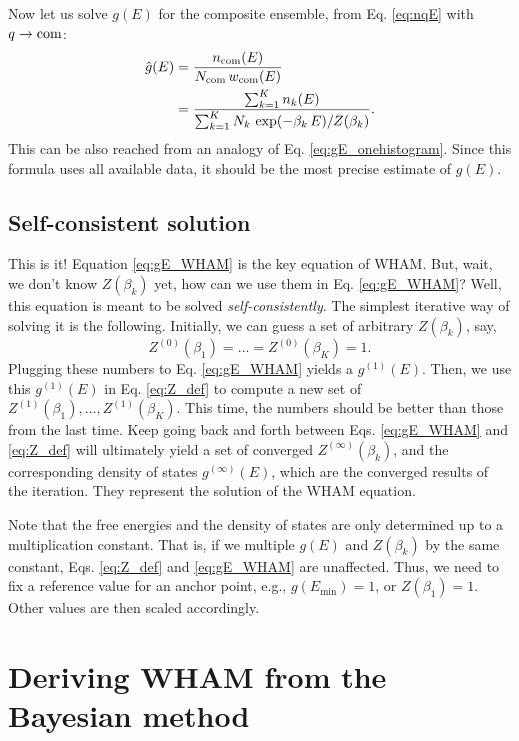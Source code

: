 \documentclass[aip,jcp,preprint,superscriptaddress]{revtex4-1}
\begin{document}
Now let us solve $g(E)$
for the composite ensemble,
from Eq. \eqref{eq:nqE}
with $q \rightarrow \mathrm{com}$:
%
\begin{align}
\hat g(E)
&=
\frac{ n_{\mathrm{com}}(E) }
{ N_{\mathrm{com}} \, w_{\mathrm{com}}(E) }
\notag \\
&=
\frac{ \sum_{k = 1}^K n_k(E) }
{ \sum_{k = 1}^K N_k \, \exp( -\beta_k \, E ) / Z(\beta_k) }.
\label{eq:gE_WHAM}
\end{align}
%
This can be also reached from an analogy
of Eq. \eqref{eq:gE_onehistogram}.
%
Since this formula uses all available data,
it should be the most precise estimate of $g(E)$.




\subsection{Self-consistent solution}


This is it!
%
Equation \eqref{eq:gE_WHAM} is the key equation of WHAM.
%
But, wait, we don't know $Z(\beta_k)$ yet,
how can we use them in Eq. \eqref{eq:gE_WHAM}?
%
Well, this equation is meant to be solved
\emph{self-consistently}.
%
The simplest iterative way of solving it is the following.
%
Initially,
we can guess a set of arbitrary
$Z(\beta_k)$,
say,
\[
  Z^{(0)}(\beta_1) = \dots = Z^{(0)}(\beta_K) = 1.
\]
%
Plugging these numbers to Eq. \eqref{eq:gE_WHAM}
yields a $g^{(1)}(E)$.
%
Then, we use this $g^{(1)}(E)$ in Eq. \eqref{eq:Z_def}
to compute a new set of
$Z^{(1)}(\beta_1), \dots, Z^{(1)}(\beta_K)$.
%
This time, the numbers should be better
than those from the last time.
%
Keep going back and forth
between Eqs. \eqref{eq:gE_WHAM} and \eqref{eq:Z_def}
will ultimately yield a set of converged
$Z^{(\infty)}(\beta_k)$,
and the corresponding density of states
$g^{(\infty)}(E)$,
which are the converged results of the iteration.
%
They represent the solution of the WHAM equation.



Note that the free energies and the density of states
are only determined up to a multiplication constant.
%
That is,
if we multiple $g(E)$ and $Z(\beta_k)$
by the same constant,
Eqs. \eqref{eq:Z_def} and \eqref{eq:gE_WHAM}
are unaffected.
%
Thus, we need to 
fix a reference value for an anchor point,
e.g.,
$g(E_{\min}) = 1$,
or
$Z(\beta_1) = 1$.
%
Other values are then scaled accordingly.





\section{\label{sec:WHAM_Bayesian}
Deriving WHAM from the Bayesian method}
\end{document}
